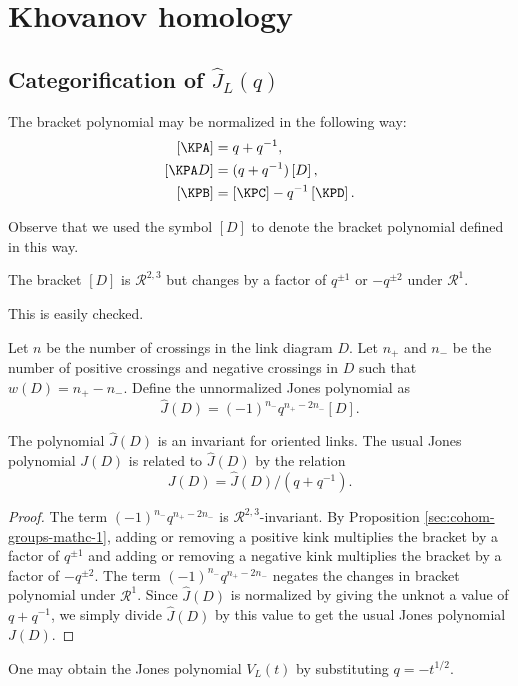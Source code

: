 \chapter{Khovanov homology}
\label{chapter6}

\section{Categorification of $\hat{J}_L(q)$}

The bracket polynomial may be normalized in the following way: 
\begin{align*}
  \left[ \KPA \right] &= q+q^{-1}, \\
  \left[ \KPA D \right] &= (q+q^{-1}) \left[ D \right], \\
  \left[ \KPB \right] &= \left[ \KPC \right] - q^{-1}\left[ \KPD \right].
\end{align*}

Observe that we used the symbol $[D]$ to denote the bracket polynomial defined in this way.
\begin{proposition}
\label{sec:cohom-groups-mathc-1}
The bracket $[D]$ is $\mathcal{R}^{2,3}$ but changes by a factor of $q^{\pm 1}$ or $-q^{\pm 2}$ under $\mathcal{R}^1$.
\end{proposition}

This is easily checked.

Let $n$ be the number of crossings in the link diagram $D$. Let $n_+$ and $n_-$ be the number of positive crossings and negative crossings in $D$ such that $w(D) = n_+ - n_-$. Define the unnormalized Jones polynomial as
\begin{equation}
\label{eq:3}
\hat{J}(D) = (-1)^{n_-} q^{n_+ - 2n_-} [D].
\end{equation}

\begin{theorem}
\label{sec:cohom-groups-mathc-4}
The polynomial $\hat{J}(D)$ is an invariant for oriented links. The usual Jones polynomial $J(D)$ is related to $\hat{J}(D)$ by the relation 
\begin{equation}
\label{eq:4}
J(D) = \hat{J}(D)/(q + q^{-1}).
\end{equation}
\end{theorem}

\begin{proof}
\label{sec:cohom-groups-mathc-5}
The term $(-1)^{n_-} q^{n_+ - 2n_-}$ is $\mathcal{R}^{2,3}$-invariant. By Proposition \ref{sec:cohom-groups-mathc-1}, adding or removing a positive kink multiplies the bracket by a factor of $q^{\pm 1}$ and adding or removing a negative kink multiplies the bracket by a factor of $-q^{\pm 2}$. The term $(-1)^{n_-} q^{n_+ - 2n_-}$ negates the changes in bracket polynomial under $\mathcal{R}^1$. Since $\hat{J}(D)$ is normalized by giving the unknot a value of $q + q^{-1}$, we simply divide $\hat{J}(D)$ by this value to get the usual Jones polynomial $J(D)$.
\end{proof}
\begin{remark}
\label{sec:cohom-groups-mathc-7}
One may obtain the Jones polynomial $V_L(t)$ by substituting $q = -t^{1/2}$.
\end{remark}

